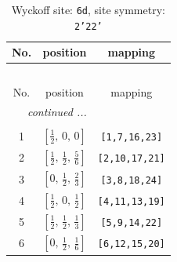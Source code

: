 \documentclass[fleqn,8pt]{jsarticle}
\begin{document}
\renewcommand{\arraystretch}{1.2}
\begin{longtable}{ccc}
\caption{Wyckoff site: {\tt 6d}, site symmetry: {\tt 2'22'}}
 \\
 \hline \hline
No. & position & mapping \\ \hline \endfirsthead

\multicolumn{2}{l}{\tablename\ \thetable{}} \\
 \hline \hline
No. & position & mapping \\ \hline \endhead

 \hline \hline
\multicolumn{2}{r}{\footnotesize\it continued ...} \\ \endfoot

 \hline \hline
\multicolumn{2}{r}{} \\ \endlastfoot

1 & $\left[ \frac{1}{2},\, 0,\, 0 \right]$ & {\tt [1,7,16,23]} \\ \hline
2 & $\left[ \frac{1}{2},\, \frac{1}{2},\, \frac{5}{6} \right]$ & {\tt [2,10,17,21]} \\ \hline
3 & $\left[ 0,\, \frac{1}{2},\, \frac{2}{3} \right]$ & {\tt [3,8,18,24]} \\ \hline
4 & $\left[ \frac{1}{2},\, 0,\, \frac{1}{2} \right]$ & {\tt [4,11,13,19]} \\ \hline
5 & $\left[ \frac{1}{2},\, \frac{1}{2},\, \frac{1}{3} \right]$ & {\tt [5,9,14,22]} \\ \hline
6 & $\left[ 0,\, \frac{1}{2},\, \frac{1}{6} \right]$ & {\tt [6,12,15,20]} \\
\end{longtable}
\renewcommand{\arraystretch}{1.2}
\end{document}
